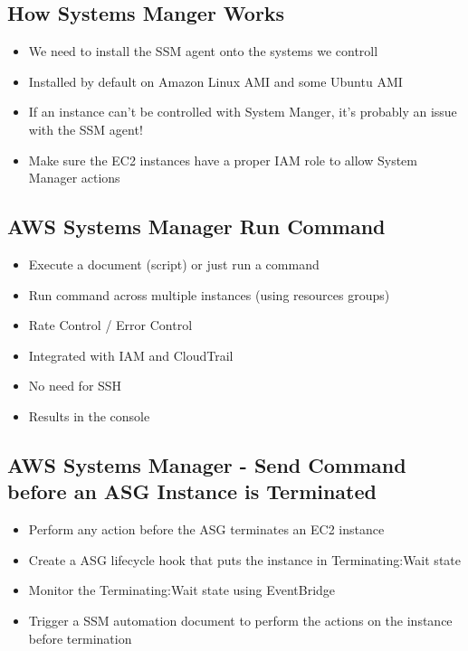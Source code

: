 \subsection{How Systems Manger Works}
\begin{itemize}
    \item We need to install the SSM agent onto the systems we controll
    \item Installed by default on Amazon Linux AMI and some Ubuntu AMI
    \item If an instance can't be controlled with System Manger, it's probably an issue with the SSM agent!
    \item Make sure the EC2 instances have a proper IAM role to allow System Manager actions
\end{itemize}

\subsection{AWS Systems Manager Run Command}
\begin{itemize}
    \item Execute a document (script) or just run a command
    \item Run command across multiple instances (using resources groups)
    \item Rate Control / Error Control
    \item Integrated with IAM and CloudTrail
    \item No need for SSH
    \item Results in the console
\end{itemize}

\subsection{AWS Systems Manager - Send Command before an ASG Instance is Terminated}
\begin{itemize}
    \item Perform any action before the ASG terminates an EC2 instance
    \item Create a ASG lifecycle hook that puts the instance in Terminating:Wait state
    \item Monitor the Terminating:Wait state using EventBridge
    \item Trigger a SSM automation document to perform the actions on the instance before termination
\end{itemize}

